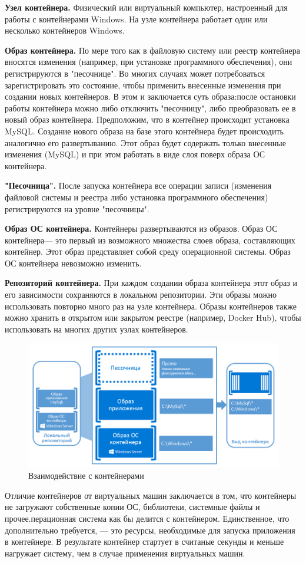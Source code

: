 \textbf{Узел контейнера.} Физический или виртуальный компьютер, настроенный для работы с контейнерами Windows. На узле контейнера работает один или несколько контейнеров Windows.


\textbf{Образ контейнера.} По мере того как в файловую систему или реестр контейнера вносятся изменения (например, при установке программного обеспечения), они регистрируются в "песочнице". Во многих случаях может потребоваться зарегистрировать это состояние, чтобы применить внесенные изменения при создании новых контейнеров. В этом и заключается суть образа:после остановки работы контейнера можно либо отключить "песочницу", либо преобразовать ее в новый образ контейнера. Предположим, что в контейнер происходит установка MySQL. Создание нового образа на базе этого контейнера будет происходить аналогично его развертыванию. Этот образ будет содержать только внесенные изменения (MySQL) и при этом работать в виде слоя поверх образа ОС контейнера.

\textbf{"Песочница".} После запуска контейнера все операции записи (изменения файловой системы и реестра либо установка программного обеспечения) регистрируются на уровне "песочницы".

\textbf{Образ ОС контейнера.} Контейнеры развертываются из образов. Образ ОС контейнера— это первый из возможного множества слоев образа, составляющих контейнер. Этот образ представляет собой среду операционной системы. Образ ОС контейнера невозможно изменить.

\textbf{Репозиторий контейнера.} При каждом создании образа контейнера этот образ и его зависимости сохраняются в локальном репозитории. Эти образы можно использовать повторно много раз на узле контейнера. Образы контейнеров также можно хранить в открытом или закрытом реестре (например, Docker Hub), чтобы использовать на многих других узлах контейнеров.

\begin{figure}[H]
  \centering
  \includegraphics[width=\textwidth]{img/containerfund}
  \caption{Взаимодействие с контейнерами}
\end{figure}
Отличие контейнеров от виртуальных машин заключается в том, что контейнеры не загружают собственные копии ОС, библиотеки, системные файлы и прочее.перационная система как бы делится с контейнером. Единственное, что дополнительно требуется, — это ресурсы, необходимые для запуска приложения в контейнере. В результате контейнер стартует в считаные секунды и меньше нагружает систему, чем в случае применения виртуальных машин.

